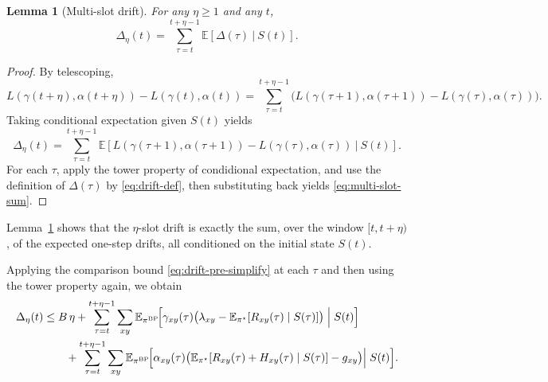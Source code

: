 \documentclass[11pt]{article}
\newtheorem{lemma}{Lemma}
\newcommand{\E}{\mathbb{E}}
\begin{document}
\begin{lemma}[Multi-slot drift]
\label{lem:multi-slot}
For any $\eta\ge 1$ and any $t$,
\begin{equation}
\Delta_\eta(t)
=
\sum_{\tau=t}^{t+\eta-1}
\E\!\left[
\Delta(\tau)\ \Big|\ S(t)
\right].
\label{eq:multi-slot-sum}
\end{equation}
\end{lemma}

\begin{proof}
By telescoping,
\[
L(\gamma(t{+}\eta),\alpha(t{+}\eta))
-
L(\gamma(t),\alpha(t))
=
\sum_{\tau=t}^{t+\eta-1}
\Big(
L(\gamma(\tau{+}1),\alpha(\tau{+}1))
-
L(\gamma(\tau),\alpha(\tau))
\Big).
\]
Taking conditional expectation given $S(t)$ yields
\[
\Delta_\eta(t)
=
\sum_{\tau=t}^{t+\eta-1}
\E\!\left[
L(\gamma(\tau{+}1),\alpha(\tau{+}1))
-
L(\gamma(\tau),\alpha(\tau))
\ \Big|\ S(t)
\right].
\]
For each $\tau$, apply the tower property of condidional expectation, and use the definition of $\Delta(\tau)$ by
\eqref{eq:drift-def},
then substituting back yields \eqref{eq:multi-slot-sum}.
\end{proof}

Lemma~\ref{lem:multi-slot} shows that the $\eta$-slot drift is
exactly the sum, over the window $[t,t{+}\eta)$, of the expected
one-step drifts, all conditioned on the initial state $S(t)$.



Applying the comparison bound
\eqref{eq:drift-pre-simplify} at each $\tau$ and then using the
tower property again, we obtain
\begin{equation}
\begin{aligned}
\Delta_{\eta}(t)
&\le
B\,\eta
+ \sum_{\tau=t}^{t+\eta-1}
\sum_{xy} \E_{\pi^{\rm BP}}\!\Big[
\gamma_{xy}(\tau)\big(\lambda_{xy}
- \E_{\pi^\star}[R_{xy}(\tau)\mid S(\tau)]\big)
\;\Big|\; S(t)
\Big]\\
&\qquad
+ \sum_{\tau=t}^{t+\eta-1}
\sum_{xy} \E_{\pi^{\rm BP}}\!\Big[
\alpha_{xy}(\tau) \big(
\E_{\pi^\star}[R_{xy}(\tau)+H_{xy}(\tau)\mid S(\tau)] -g_{xy}
\big)\Big|\; S(t)
\Big].
\end{aligned}
\label{eq:frame-drift-preavg}
\end{equation}
\end{document}
